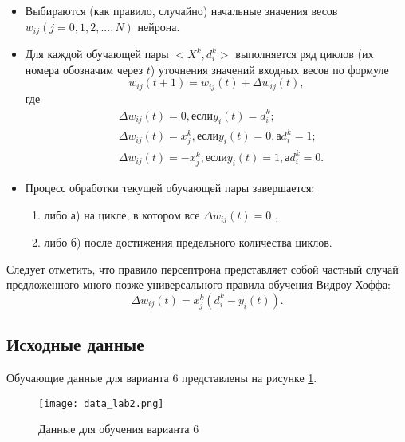 \begin{itemize}
\item Выбираются (как правило, случайно) начальные значения весов $w_{ij} (j=0, 1, 2, ..., N)$ нейрона.

\item Для каждой обучающей пары $<X^k, d^k_i>$ выполняется ряд циклов (их номера обозначим через $t$) уточнения значений входных весов по формуле
\begin{equation}
  w_{ij}(t+1) = w_{ij}(t) + \Delta w_{ij}(t),
\end{equation}
где
\begin{equation}\label{eq:system}
	\begin{aligned}
	& \Delta w_{ij}(t)=0, если y_i(t)=d^k_i; \\
	& \Delta w_{ij}(t)=x^k_j, если y_i(t)=0, а d^k_i=1; \\
	& \Delta w_{ij}(t)=-x^k_j, если y_i(t)=1, а d^k_i=0. 
	\end{aligned}  		
\end{equation}

\item Процесс обработки текущей обучающей пары завершается:
	\begin{enumerate}
	\item[] либо а) на цикле, в котором все $\Delta w_{ij}(t)=0$ ,
	\item[] либо б) после достижения предельного количества циклов.
	\end{enumerate}
\end{itemize}

Следует отметить, что правило персептрона представляет собой частный случай предложенного много позже универсального правила обучения Видроу-Хоффа:
\begin{equation}\label{eq:vidHoff}
  \Delta w_{ij}(t)=x^k_j(d^k_i-y_i(t)).
\end{equation}

\subsection{Исходные данные}

Обучающие данные для варианта 6 представлены на рисунке \ref{img:data_lab2}.

\begin{figure}[H]
\centering
\texttt{[image: data\_lab2.png]}
\caption{Данные для обучения варианта 6}
\label{img:data_lab2}
\end{figure}

